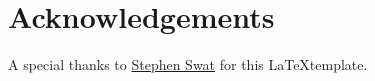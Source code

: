 


\renewcommand{\familydefault}{\sfdefault}
\swrpgbackground



\tableofcontents

\begin{sloppypar}
\setlength{\parindent}{0in}





\section{Acknowledgements}
A special thanks to \href{https://github.com/StephenSwat/Star-Wars-RPG-LaTeX}{Stephen Swat} for this \LaTeX template.

% 

\end{sloppypar}

